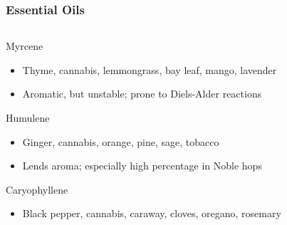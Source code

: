 \documentclass{beamer}
\begin{document}
\begin{frame}\frametitle{Essential Oils}
  \begin{columns}
    \begin{column}{0.6\textwidth}
      Myrcene
      \begin{itemize}
      \item Thyme, cannabis, lemmongrass, bay leaf, mango, lavender
      \item Aromatic, but unstable; prone to Diels-Alder reactions
      \end{itemize}
      Humulene
      \begin{itemize}
      \item Ginger, cannabis, orange, pine, sage, tobacco
      \item Lends aroma;  especially high percentage in Noble hops
      \end{itemize}
      Caryophyllene
      \begin{itemize}
      \item Black pepper, cannabis, caraway, cloves, oregano, rosemary
      \end{itemize}
    \end{column}


\end{columns}
\end{frame}
\end{document}
